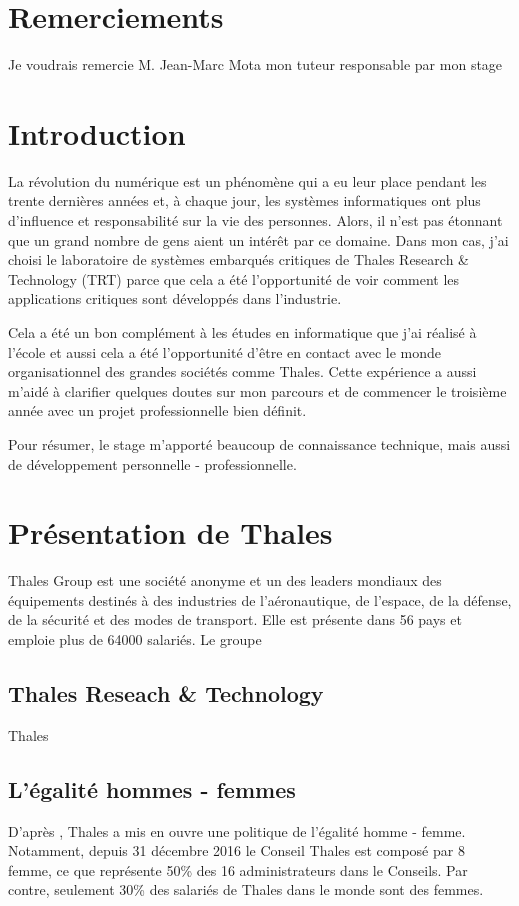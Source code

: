 \documentclass[a4paper, 12pt]{article} %
\begin{document}
\newpage
{}
\section*{Remerciements}
Je voudrais remercie M. Jean-Marc Mota mon tuteur responsable par mon stage

\newpage
\tableofcontents

\newpage
\section{Introduction}
La révolution du numérique est un phénomène qui a eu leur place pendant les trente dernières années et, à chaque jour, les systèmes informatiques ont plus d'influence et responsabilité sur la vie des personnes. Alors, il n'est pas étonnant que un grand nombre de gens aient un intérêt par ce domaine. Dans mon cas, j'ai choisi le laboratoire de systèmes embarqués critiques de Thales Research \& Technology (TRT) parce que cela a été l'opportunité de voir comment les applications critiques sont développés dans l'industrie.

Cela a été un bon complément à les études en informatique que j'ai réalisé à l'école et aussi cela a été l'opportunité d'être en contact avec le monde organisationnel des grandes sociétés comme Thales. Cette expérience a aussi m'aidé à clarifier quelques doutes sur mon parcours et de commencer le troisième année avec un projet professionnelle bien définit. 

Pour résumer, le stage m'apporté beaucoup de connaissance technique, mais aussi de développement personnelle - professionnelle.

\newpage
\section{Présentation de Thales}
 Thales Group est une société anonyme et un des leaders mondiaux des équipements destinés à des industries de l'aéronautique, de l'espace, de la défense, de la sécurité et des modes de transport. Elle est présente dans 56 pays et emploie plus de 64000 salariés.
 Le groupe 
 
\subsection{Thales Reseach \& Technology}
Thales 

\subsection{L'égalité hommes - femmes}
D'après \cite{thales}, Thales a mis en ouvre une politique de l'égalité homme - femme. Notamment, depuis 31 décembre 2016 le Conseil Thales est composé par 8 femme, ce que représente 50\% des 16 administrateurs dans le Conseils. Par contre, seulement 30\% des salariés de Thales dans le monde sont des femmes.
\end{document}
